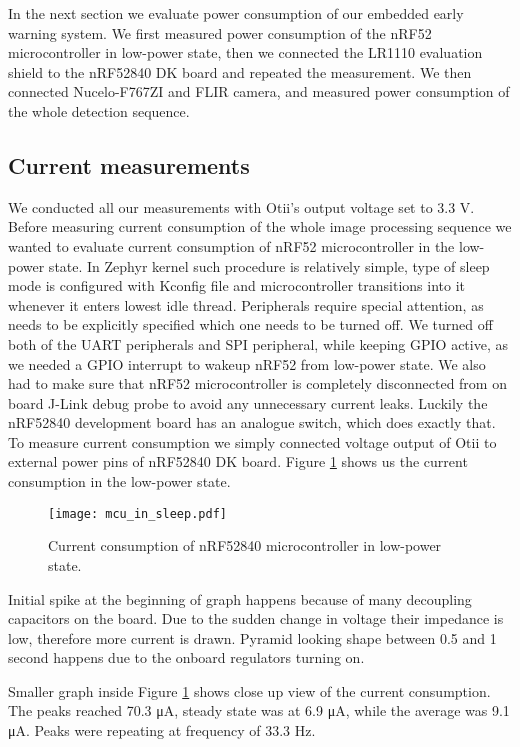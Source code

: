 In the next section we evaluate power consumption of our embedded early warning system.
We first measured power consumption of the nRF52 microcontroller in low-power state, then we connected the LR1110 evaluation shield to the nRF52840 DK board and repeated the measurement.
We then connected Nucelo-F767ZI and FLIR camera, and measured power consumption of the whole detection sequence.


\subsection{ Current measurements}

We conducted all our measurements with Otii's output voltage set to 3.3 V.
Before measuring current consumption of the whole image processing sequence we wanted to evaluate current consumption of nRF52 microcontroller in the low-power state.
In Zephyr kernel such procedure is relatively simple, type of sleep mode is configured with Kconfig file and microcontroller transitions into it whenever it enters lowest idle thread.
Peripherals require special attention, as needs to be explicitly specified which one needs to be turned off.
We turned off both of the UART peripherals and SPI peripheral, while keeping GPIO active, as we needed a GPIO interrupt to wakeup nRF52 from low-power state.
We also had to make sure that nRF52 microcontroller is completely disconnected from on board J-Link debug probe to avoid any unnecessary current leaks.
Luckily the nRF52840 development board has an analogue switch, which does exactly that.
To measure current consumption we simply connected voltage output of Otii to external power pins of nRF52840 DK board.
Figure \ref{mcu_in_sleep} shows us the current consumption in the low-power state.

\begin{figure}[ht]
    \centering
    \texttt{[image: mcu\_in\_sleep.pdf]}
    \caption{ Current consumption of nRF52840 microcontroller in low-power state.}
    \label{mcu_in_sleep}
\end{figure}

Initial spike at the beginning of graph happens because of many decoupling capacitors on the board.
Due to the sudden change in voltage their impedance is low, therefore more current is drawn.
Pyramid looking shape between 0.5 and 1 second happens due to the onboard regulators turning on.

Smaller graph inside Figure \ref{mcu_in_sleep} shows close up view of the current consumption.
The peaks reached 70.3 \si{\micro\ampere}, steady state was at 6.9 \si{\micro\ampere}, while the average was 9.1 \si{\micro\ampere}.
Peaks were repeating at frequency of 33.3 \si{\hertz}.

